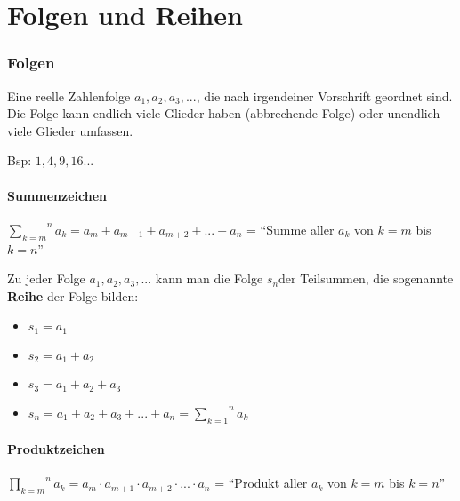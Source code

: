 
\part*{Folgen und Reihen}


\section*{Folgen}

Eine reelle Zahlenfolge $a_{1},a_{2},a_{3},...$, die nach irgendeiner
Vorschrift geordnet sind. Die Folge kann endlich viele Glieder haben
(abbrechende Folge) oder unendlich viele Glieder umfassen.

Bsp: $1,4,9,16...$


\subsection*{Summenzeichen}

$\overset{n}{\underset{k=m}{\sum}}a_{k}=a_{m}+a_{m+1}+a_{m+2}+...+a_{n}$
= ``Summe aller $a_{k}$ von $k=m$ bis $k=n$''

Zu jeder Folge $a_{1},a_{2},a_{3},...$ kann man die Folge $s_{n}$der
Teilsummen, die sogenannte \textbf{Reihe} der Folge bilden:
\begin{itemize}
\item $s_{1}=a_{1}$ 
\item $s_{2}=a_{1}+a_{2}$ 
\item $s_{3}=a_{1}+a_{2}+a_{3}$ 
\item $s_{n}=a_{1}+a_{2}+a_{3}+...+a_{n}=\overset{n}{\underset{k=1}{\sum}}a_{k}$ 
\end{itemize}

\subsection*{Produktzeichen}

$\overset{n}{\underset{k=m}{\prod}}a_{k}=a_{m}\cdot a_{m+1}\cdot a_{m+2}\cdot...\cdot a_{n}$
= ``Produkt aller $a_{k}$ von $k=m$ bis $k=n$''


